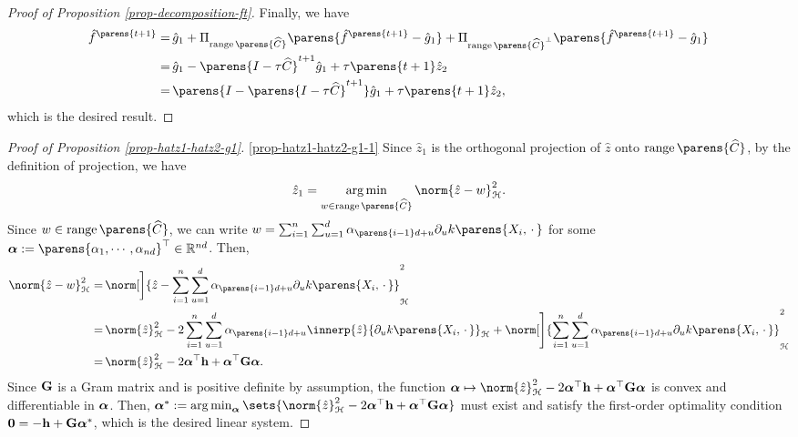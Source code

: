 \begin{proof}[Proof of Proposition \ref{prop-decomposition-ft}]
	Finally, we have 
	\begin{align*}
		\hat{f}^{\parens{t+1}} = & \, \hat{g}_1 + \Pi_{\range \parens{\widehat{C}}} \parens{\hat{f}^{\parens{t+1}} - \hat{g}_1} + \Pi_{\range \parens{\widehat{C}}^{\perp}} \parens{\hat{f}^{\parens{t+1}} - \hat{g}_1} \nonumber \\ 
		= & \, \hat{g}_1 - \parens{I - \tau \widehat{C}}^{t+1} \hat{g}_1 + \tau \parens{t+1} \hat{z}_2 \nonumber \\ 
		= & \, \parens{I - \parens{I - \tau \widehat{C}}^{t+1}} \hat{g}_1 + \tau \parens{t+1} \hat{z}_2, 
	\end{align*}
	which is the desired result. 
\end{proof}


\begin{proof}[Proof of Proposition \ref{prop-hatz1-hatz2-g1}]
	\ref{prop-hatz1-hatz2-g1-1} Since $\hat{z}_1$ is the orthogonal projection of $\hat{z}$ onto $\range \parens{\widehat{C}}$, by the definition of projection, we have 
		\begin{align*}
			\hat{z}_1 = \argmin_{w \in \range \parens{\widehat{C}}} \norm{\hat{z} - w}_{\calH}^2. 
		\end{align*}
	Since $w \in \range \parens{\widehat{C}}$, we can write $w = \sum_{i=1}^n \sum_{u=1}^d \alpha_{\parens{i-1}d+u} \partial_u k \parens{X_i, \,\cdot\,}$ for some $\balpha := \parens{\alpha_{1}, \cdots, \alpha_{nd}}^\top \in \Real^{nd}$. Then, 
	\begin{align*}
		\norm{\hat{z} - w}_{\calH}^2 = & \, \norm[\bigg]{\hat{z} - \sum_{i=1}^n \sum_{u=1}^d \alpha_{\parens{i-1}d+u} \partial_u k \parens{X_i, \,\cdot\,}}_{\calH}^2 \nonumber \\ 
		= & \, \norm{\hat{z}}_{\calH}^2 - 2 \sum_{i=1}^n \sum_{u=1}^d  \alpha_{\parens{i-1}d+u} \innerp{\hat{z}}{ \partial_u k \parens{X_i, \,\cdot\,} }_{\calH} + \norm[\Bigg]{\sum_{i=1}^n \sum_{u=1}^d \alpha_{\parens{i-1}d+u} \partial_u k \parens{X_i, \,\cdot\,}}_{\hil}^2 \nonumber \\ 
		= & \, \norm{\hat{z}}_{\calH}^2 - 2 \balpha^\top \bh + \balpha^\top \bG \balpha. 
	\end{align*}
	Since $\mathbf{G}$ is a Gram matrix and is positive definite by assumption, the function $\balpha \mapsto \norm{\hat{z}}_{\calH}^2 - 2 \balpha^\top \bh + \balpha^\top \bG \balpha$ is convex and differentiable in $\boldsymbol{\alpha}$. Then, $\balpha^* := \argmin_{\balpha} \sets{\norm{\hat{z}}_{\calH}^2 - 2 \balpha^\top \bh + \balpha^\top \bG \balpha}$ must exist and satisfy the first-order optimality condition $\mathbf{0} = - \mathbf{h} + \mathbf{G} \boldsymbol{\alpha}^*$, which is the desired linear system. 


\end{proof}
